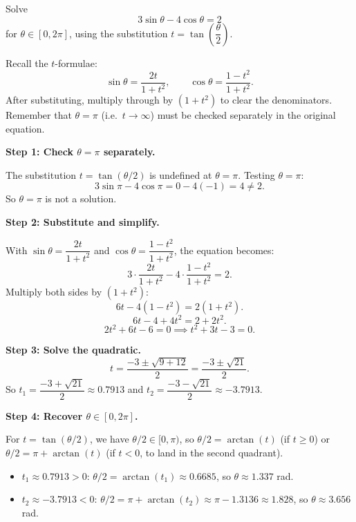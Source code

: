 \begin{problem}
Solve
\[
3\sin\theta - 4\cos\theta = 2
\]
for $\theta \in [0, 2\pi]$, using the substitution $t = \tan\!\left(\dfrac{\theta}{2}\right)$.
\end{problem}

\begin{hintbox}
Recall the $t$-formulae:
\[
\sin\theta = \frac{2t}{1+t^2},\qquad \cos\theta = \frac{1-t^2}{1+t^2}.
\]
After substituting, multiply through by $(1+t^2)$ to clear the denominators. Remember that $\theta = \pi$ (i.e.\ $t \to \infty$) must be checked separately in the original equation.
\end{hintbox}

\begin{solution}

\textbf{Step 1: Check $\theta = \pi$ separately.}

The substitution $t = \tan(\theta/2)$ is undefined at $\theta = \pi$. Testing $\theta = \pi$:
\[
3\sin\pi - 4\cos\pi = 0 - 4(-1) = 4 \neq 2.
\]
So $\theta = \pi$ is not a solution.

\medskip
\textbf{Step 2: Substitute and simplify.}

With $\sin\theta = \dfrac{2t}{1+t^2}$ and $\cos\theta = \dfrac{1-t^2}{1+t^2}$, the equation becomes:
\[
3\cdot\frac{2t}{1+t^2} - 4\cdot\frac{1-t^2}{1+t^2} = 2.
\]
Multiply both sides by $(1+t^2)$:
\[
6t - 4(1-t^2) = 2(1+t^2).
\]
\[
6t - 4 + 4t^2 = 2 + 2t^2.
\]
\[
2t^2 + 6t - 6 = 0
\implies
t^2 + 3t - 3 = 0.
\]

\textbf{Step 3: Solve the quadratic.}
\[
t = \frac{-3 \pm \sqrt{9 + 12}}{2} = \frac{-3 \pm \sqrt{21}}{2}.
\]
So $t_1 = \dfrac{-3 + \sqrt{21}}{2} \approx 0.7913$ and
   $t_2 = \dfrac{-3 - \sqrt{21}}{2} \approx -3.7913$.

\medskip
\textbf{Step 4: Recover $\theta \in [0, 2\pi]$.}

For $t = \tan(\theta/2)$, we have $\theta/2 \in [0, \pi)$, so $\theta/2 = \arctan(t)$ (if $t \ge 0$)
or $\theta/2 = \pi + \arctan(t)$ (if $t < 0$, to land in the second quadrant).

\begin{itemize}[leftmargin=*]
  \item $t_1 \approx 0.7913 > 0$: $\theta/2 = \arctan(t_1) \approx 0.6685$, so
        $\theta \approx 1.337$ rad.
  \item $t_2 \approx -3.7913 < 0$: $\theta/2 = \pi + \arctan(t_2) \approx \pi - 1.3136 \approx 1.828$,
        so $\theta \approx 3.656$ rad.
\end{itemize}


\end{solution}

